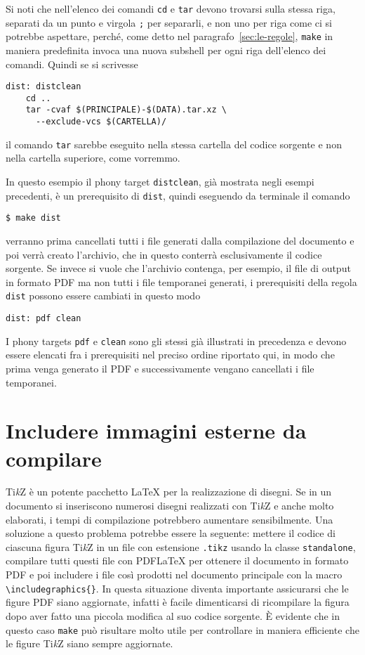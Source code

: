 Si noti che nell'elenco dei comandi \texttt{cd} e \texttt{tar} devono trovarsi
sulla stessa riga, separati da un punto e virgola \texttt{;} per separarli, e
non uno per riga come ci si potrebbe aspettare, perché, come detto nel
paragrafo~\ref{sec:le-regole}, \texttt{make} in maniera predefinita invoca una
nuova subshell per ogni riga dell'elenco dei comandi.  Quindi se si scrivesse
\begin{lstlisting}
dist: distclean
	cd ..
	tar -cvaf $(PRINCIPALE)-$(DATA).tar.xz \
	  --exclude-vcs $(CARTELLA)/
\end{lstlisting}
il comando \texttt{tar} sarebbe eseguito nella stessa cartella del codice
sorgente e non nella cartella superiore, come vorremmo.

In questo esempio il phony target \texttt{distclean}, già mostrata negli esempi
precedenti, è un prerequisito di \texttt{dist}, quindi eseguendo da terminale il
comando
\begin{verbatim}
$ make dist
\end{verbatim}
verranno prima cancellati tutti i file generati dalla compilazione del documento
e poi verrà creato l'archivio, che in questo conterrà esclusivamente il codice
sorgente.  Se invece si vuole che l'archivio contenga, per esempio, il file di
output in formato \textsc{PDF} ma non tutti i file temporanei generati, i
prerequisiti della regola \texttt{dist} possono essere cambiati in questo modo
\begin{lstlisting}
dist: pdf clean
\end{lstlisting}
I phony targets \texttt{pdf} e \texttt{clean} sono gli stessi già illustrati in
precedenza e devono essere elencati fra i prerequisiti nel preciso ordine
riportato qui, in modo che prima venga generato il \textsc{PDF} e
successivamente vengano cancellati i file temporanei.

\section{Includere immagini esterne da compilare}
\label{sec:includere-immagini-esterne}

Ti\emph{k}Z è un potente pacchetto \LaTeX{}
per la realizzazione di disegni.  Se in un documento si inseriscono numerosi
disegni realizzati con Ti\emph{k}Z e anche molto elaborati, i tempi di
compilazione potrebbero aumentare sensibilmente.  Una soluzione a questo
problema potrebbe essere la seguente: mettere il codice di ciascuna figura
Ti\emph{k}Z in un file con estensione \texttt{.tikz} usando la classe
\texttt{standalone}, compilare tutti questi file con \textsc{PDF}\LaTeX{}
per ottenere il documento in formato \textsc{PDF} e poi includere i file così
prodotti nel documento principale con la macro
\texttt{\textbackslash{}includegraphics\{\}}.  In questa situazione diventa
importante assicurarsi che le figure \textsc{PDF} siano aggiornate, infatti è
facile dimenticarsi di ricompilare la figura dopo aver fatto una piccola
modifica al suo codice sorgente.  È evidente che in questo caso \texttt{make}
può risultare molto utile per controllare in maniera efficiente che le figure
Ti\emph{k}Z siano sempre aggiornate.

